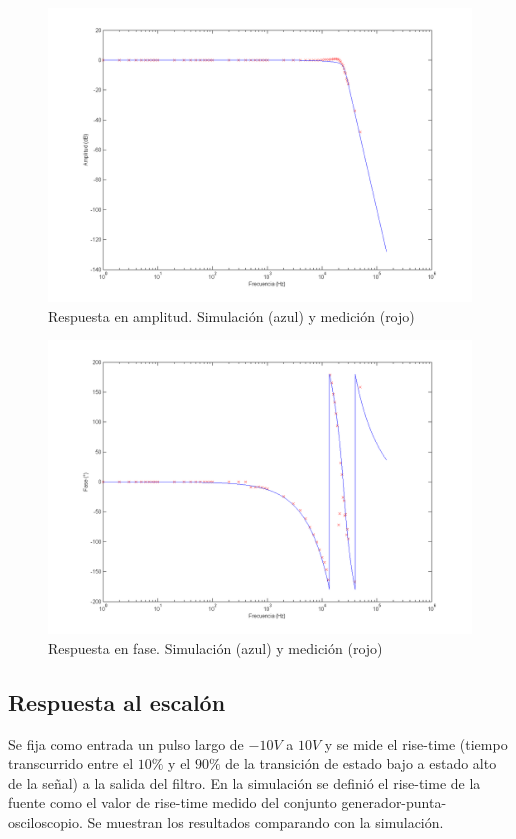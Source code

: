 \documentclass[12pt,a4paper]{article}
\begin{document}
\begin{figure}[H]
\centering
\includegraphics[width=\textwidth]{img/amp.png}
\caption{Respuesta en amplitud. Simulación (azul) y medición (rojo)}
\end{figure}
\begin{figure}[H]
\centering
\includegraphics[width=\textwidth]{img/fase.png}
\caption{Respuesta en fase. Simulación (azul) y medición (rojo)}
\end{figure}

\subsection{Respuesta al escalón}

Se fija como entrada un pulso largo de $-10V$ a $10V$ y se mide el rise-time (tiempo transcurrido entre el $10\%$ y el $90\%$ de la transición de estado bajo a estado alto de la señal) a la salida del filtro. En la simulación se definió el rise-time de la fuente como el valor de rise-time medido del conjunto generador-punta-osciloscopio. Se muestran los resultados comparando con la simulación.
\end{document}
